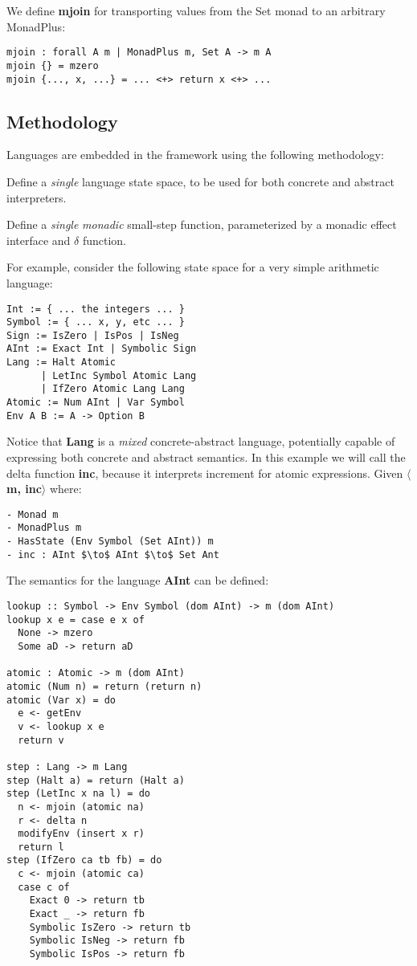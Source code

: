 We define \textbf{mjoin} for transporting values from the Set monad to an
arbitrary MonadPlus:
\begin{lstlisting}
mjoin : forall A m | MonadPlus m, Set A -> m A
mjoin {} = mzero
mjoin {..., x, ...} = ... <+> return x <+> ...
\end{lstlisting}

\subsection{Methodology}
Languages are embedded in the framework using the following methodology:
\begin{itemizenobreak}
  \item 
  Define a \textit{single} language state space, to be used for both concrete
  and abstract interpreters.
  \item 
  Define a \textit{single} \textit{monadic} small-step function, parameterized
  by a monadic effect interface and $\delta$ function.
\end{itemizenobreak}
For example, consider the following state space for a very simple arithmetic
language:
\begin{lstlisting}
Int := { ... the integers ... }
Symbol := { ... x, y, etc ... }
Sign := IsZero | IsPos | IsNeg
AInt := Exact Int | Symbolic Sign
Lang := Halt Atomic 
      | LetInc Symbol Atomic Lang 
      | IfZero Atomic Lang Lang 
Atomic := Num AInt | Var Symbol
Env A B := A -> Option B
\end{lstlisting}
Notice that \textbf{Lang} is a \textit{mixed} concrete-abstract language,
potentially capable of expressing both concrete and abstract semantics.
%
In this example we will call the delta function \textbf{inc}, because it
interprets increment for atomic expressions. Given \textbf{$\langle$m,
inc$\rangle$} where:
\begin{lstlisting}
- Monad m
- MonadPlus m
- HasState (Env Symbol (Set AInt)) m
- inc : AInt $\to$ AInt $\to$ Set Ant
\end{lstlisting}
The semantics for the language \textbf{AInt} can be defined:
\begin{lstlisting}
lookup :: Symbol -> Env Symbol (dom AInt) -> m (dom AInt)
lookup x e = case e x of
  None -> mzero
  Some aD -> return aD

atomic : Atomic -> m (dom AInt)
atomic (Num n) = return (return n)
atomic (Var x) = do
  e <- getEnv
  v <- lookup x e
  return v

step : Lang -> m Lang
step (Halt a) = return (Halt a)
step (LetInc x na l) = do
  n <- mjoin (atomic na)
  r <- delta n
  modifyEnv (insert x r)
  return l
step (IfZero ca tb fb) = do
  c <- mjoin (atomic ca)
  case c of
    Exact 0 -> return tb
    Exact _ -> return fb
    Symbolic IsZero -> return tb
    Symbolic IsNeg -> return fb
    Symbolic IsPos -> return fb
\end{lstlisting}

